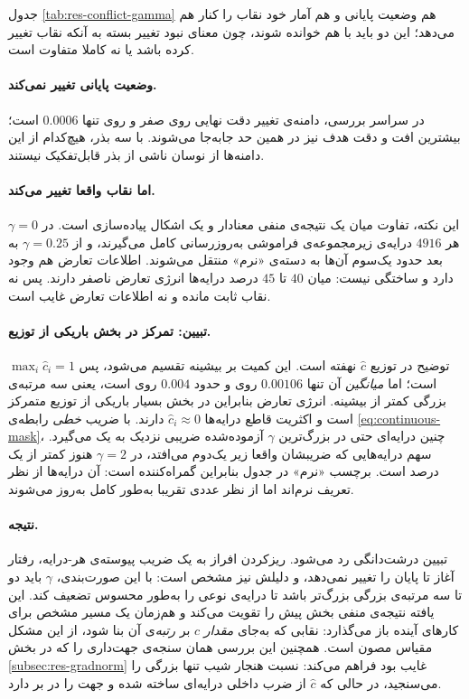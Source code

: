 

جدول \ref{tab:res-conflict-gamma} هم وضعیت پایانی و هم آمار خود نقاب را کنار هم می‌دهد؛ این دو باید با هم خوانده شوند، چون معنای نبود تغییر بسته به آنکه نقاب تغییر کرده باشد یا نه کاملا متفاوت است.

\paragraph{وضعیت پایانی تغییر نمی‌کند.} در سراسر بررسی، دامنه‌ی تغییر دقت نهایی روی  صفر و روی  تنها $0.0006$ است؛ بیشترین افت و دقت هدف نیز در همین حد جابه‌جا می‌شوند. با سه بذر، هیچ‌کدام از این دامنه‌ها از نوسان ناشی از بذر قابل‌تفکیک نیستند.

\paragraph{اما نقاب واقعا تغییر می‌کند.} این نکته، تفاوت میان یک نتیجه‌ی منفی معنادار و یک اشکال پیاده‌سازی است. در $\gamma=0$ هر $4916$ درایه‌ی زیرمجموعه‌ی فراموشی به‌روزرسانی کامل می‌گیرند، و از $\gamma=0.25$ به بعد حدود یک‌سوم آن‌ها به دسته‌ی «نرم» منتقل می‌شوند. اطلاعات تعارض هم وجود دارد و ساختگی نیست: میان $40$ تا $45$ درصد درایه‌ها انرژی تعارض ناصفر دارند. پس نه نقاب ثابت مانده و نه اطلاعات تعارض غایب است.

\paragraph{تبیین: تمرکز در بخش باریکی از توزیع.} توضیح در توزیع $\hat c$ نهفته است. این کمیت بر بیشینه تقسیم می‌شود، پس $\max_i\hat c_i=1$ است؛ اما \emph{میانگین} آن تنها $0.00106$ روی  و حدود $0.004$ روی  است، یعنی سه مرتبه‌ی بزرگی کمتر از بیشینه. انرژی تعارض بنابراین در بخش بسیار باریکی از توزیع متمرکز است و اکثریت قاطع درایه‌ها $\hat c_i\approx0$ دارند. با ضریب \emph{خطی} رابطه‌ی \eqref{eq:continuous-mask}، چنین درایه‌ای حتی در بزرگ‌ترین $\gamma$ آزموده‌شده ضریبی نزدیک به یک می‌گیرد. سهم درایه‌هایی که ضریبشان واقعا زیر یک‌دوم می‌افتد، در $\gamma=2$ هنوز کمتر از یک درصد است. برچسب «نرم» در جدول بنابراین گمراه‌کننده است: آن درایه‌ها از نظر تعریف نرم‌اند اما از نظر عددی تقریبا به‌طور کامل به‌روز می‌شوند.

\paragraph{نتیجه.} تبیین درشت‌دانگی رد می‌شود. ریزکردن افراز به یک ضریب پیوسته‌ی هر-درایه، رفتار آغاز تا پایان را تغییر نمی‌دهد، و دلیلش نیز مشخص است: با این صورت‌بندی، $\gamma$ باید دو تا سه مرتبه‌ی بزرگی بزرگ‌تر باشد تا درایه‌ی نوعی را به‌طور محسوس تضعیف کند. این یافته نتیجه‌ی منفی بخش پیش را تقویت می‌کند و هم‌زمان یک مسیر مشخص برای کارهای آینده باز می‌گذارد: نقابی که به‌جای \emph{مقدار} $\hat c$ بر \emph{رتبه}‌ی آن بنا شود، از این مشکل مقیاس مصون است. همچنین این بررسی همان سنجه‌ی جهت‌داری را که در بخش \ref{subsec:res-gradnorm} غایب بود فراهم می‌کند: نسبت هنجار شیب تنها بزرگی را می‌سنجید، در حالی که $\hat c$ از ضرب داخلی درایه‌ای ساخته شده و جهت را در بر دارد.


